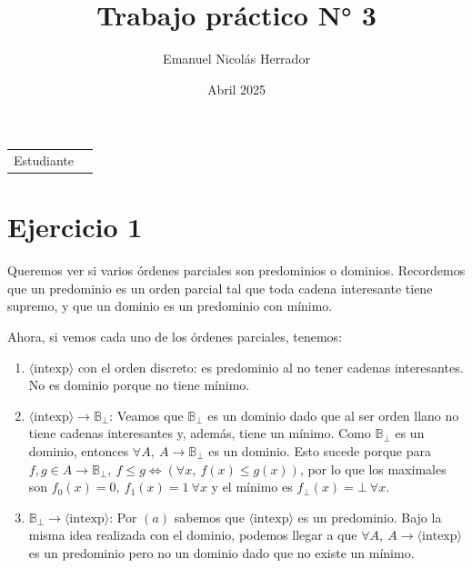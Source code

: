 \documentclass{article}
\title{Trabajo práctico N° 3}
\author{Emanuel Nicolás Herrador}
\date{Abril 2025}
\newcommand{\aexp}[1]{\langle\text{#1}\rangle}
\newcommand{\intexp}{\aexp{intexp}}
\newcommand{\B}{\mathbb{B}}
\begin{document}
\maketitle

\noindent\begin{tabular}{@{}ll}
	Estudiante & \theauthor \\
\end{tabular}

\section*{Ejercicio 1}
Queremos ver si varios órdenes parciales son predominios o dominios.
Recordemos que un predominio es un orden parcial tal que toda cadena interesante tiene supremo, y que un dominio es un predominio con mínimo.

Ahora, si vemos cada uno de los órdenes parciales, tenemos:
\begin{enumerate}[label=(\alph*)]
	\item $\intexp$ con el orden discreto: es predominio al no tener cadenas interesantes.
	      No es dominio porque no tiene mínimo.
	\item $\intexp \to \B_\bot$: Veamos que $\B_\bot$ es un dominio dado que al ser orden llano no tiene cadenas interesantes y, además, tiene un mínimo.
	      Como $\B_\bot$ es un dominio, entonces $\forall A,\ A \to \B_\bot$ es un dominio.
	      Esto sucede porque para $f, g \in A \to \B_\bot,\ f \leq g \iff (\forall x,\ f(x) \leq g(x))$, por lo que los maximales son $f_0(x) = 0,\ f_1(x) = 1\ \forall x$ y el mínimo es $f_\bot(x) = \bot\ \forall x$.
	\item $\B_\bot \to \intexp$: Por $(a)$ sabemos que $\intexp$ es un predominio.
	      Bajo la misma idea realizada con el dominio, podemos llegar a que $\forall A,\ A \to \intexp$ es un predominio pero no un dominio dado que no existe un mínimo.
\end{enumerate}
\end{document}

